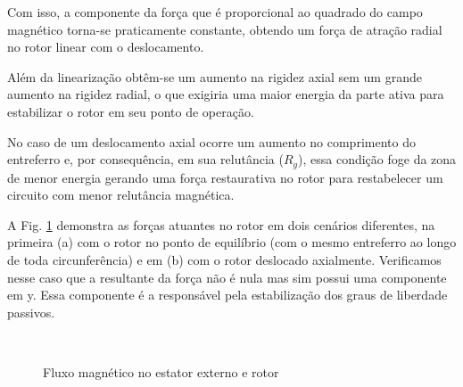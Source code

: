 Com isso, a componente da força que é proporcional ao quadrado do campo magnético torna-se praticamente constante, obtendo um força de atração radial no rotor linear com o deslocamento.

Além da linearização obtêm-se um aumento na rigidez axial sem um grande aumento na rigidez radial, o que exigiria uma maior energia da parte ativa para estabilizar o rotor em seu ponto de operação. 

No caso de um deslocamento axial ocorre um aumento no comprimento do entreferro e, por consequência, em sua relutância ($R_{g}$), essa condição foge da zona de menor energia gerando uma força restaurativa no rotor para restabelecer um circuito com menor relutância magnética.

A Fig. \ref{fig:modelo:circuito:passivo:forcas} demonstra as forças atuantes no rotor em dois cenários diferentes, na primeira (a) com o rotor no ponto de equilíbrio (com o mesmo entreferro ao longo de toda circunferência) e em (b) com o rotor deslocado axialmente. Verificamos nesse caso que a resultante da força não é nula mas sim possui uma componente em y. Essa componente é a responsável pela estabilização dos graus de liberdade passivos.

\begin{figure}[th!]
\centering
{} \\
\caption{Fluxo magnético no estator externo e rotor}
\label{fig:modelo:circuito:passivo:forcas}
\end{figure}

